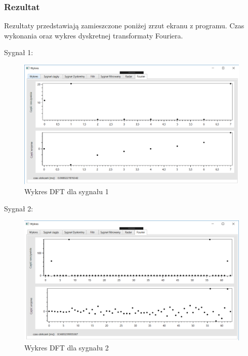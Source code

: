 \documentclass[12pt]{article}
\begin{document}
\subsubsection{Rezultat}

Rezultaty przedstawiają zamieszczone poniżej zrzut ekranu z programu. Czas wykonania oraz wykres dyskretnej transformaty Fouriera.

 Sygnał 1:
\begin{figure}[h!]
 \centering
 \includegraphics[width=12.3cm]{s13F.PNG}
 \vspace{-0.3cm}
 \caption{Wykres DFT dla sygnału 1}
 \label{Wykres dla wynikw eksperymentu pierwszego}
\end{figure}

Sygnał 2:
\begin{figure}[h!]
 \centering
 \includegraphics[width=12.3cm]{s16F.PNG}
 \vspace{-0.3cm}
 \caption{Wykres DFT dla sygnału 2}
 \label{Wykres dla wynikw eksperymentu pierwszego}
\end{figure}
\end{document}
